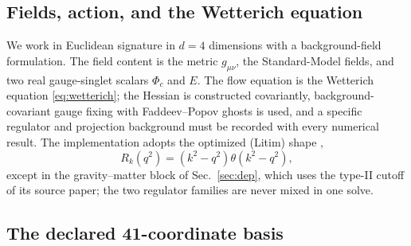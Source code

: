 \documentclass[11pt]{article}
\begin{document}
\subsection{Fields, action, and the Wetterich equation}
\label{sec:fields}

We work in Euclidean signature in $d=4$ dimensions with a background-field
formulation.  The field content is the metric $g_{\mu\nu}$, the Standard-Model
fields, and two real gauge-singlet scalars $\Phi_c$ and $E$.  The flow
equation is the Wetterich equation \eqref{eq:wetterich}; the Hessian is
constructed covariantly, background-covariant gauge fixing with
Faddeev--Popov ghosts is used, and a specific regulator and projection
background must be recorded with every numerical result.  The implementation
adopts the optimized (Litim) shape \cite{litim01},
\begin{equation}
  \label{eq:litim}
  R_k(q^2)=\left(k^2-q^2\right)\theta\!\left(k^2-q^2\right),
\end{equation}
except in the gravity--matter block of Sec.~\ref{sec:dep}, which uses the
type-II cutoff of its source paper; the two regulator families are never mixed
in one solve.

\subsection{The declared 41-coordinate basis}
\label{sec:basis}
\end{document}
